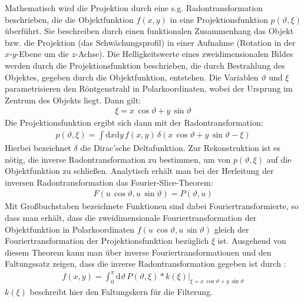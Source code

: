 \documentclass[11pt, a4paper]{article}
\numberwithin{equation}{section}
\begin{document}
Mathematisch wird die Projektion durch eine s.g. Radontransformation beschrieben, die die Objektfunktion $f(x, y)$ in eine Projektionsfunktion $p(\vartheta, \xi)$ überführt.
Sie beschreiben durch einen funktionalen Zusammenhang das Objekt bzw. die Projektion (das Schwächungsprofil) in einer Aufnahme (Rotation in der $x$-$y$-Ebene um die $z$-Achse).
Die Helligkeitswerte eines zweidimensionalen Bildes werden durch die Projektionsfunktion beschrieben, die durch Bestrahlung des Objektes, gegeben durch die Objektfunktion, entstehen.
Die Variablen $\vartheta$ und $\xi$ parametrisieren den Röntgenstrahl in Polarkoordinaten, wobei der Ursprung im Zentrum des Objekts liegt.
Dann gilt:
\begin{align}
\xi=x\,\cos\vartheta + y\,\sin\vartheta
\end{align}
Die Projektionsfunktion ergibt sich dann mit der Radontransformation:
\begin{align}
p(\vartheta, \xi)=\int\mathrm{d}x\mathrm{d}y\,f(x, y)\,\delta(x\,\cos\vartheta + y\,\sin\vartheta - \xi)
\end{align}
Hierbei bezeichnet $\delta$ die Dirac'sche Deltafunktion.
Zur Rekonstruktion ist es nötig, die inverse Radontransformation zu bestimmen, um von $p(\vartheta, \xi)$ auf die Objektfunktion zu schließen.
Analytisch erhält man bei der Herleitung der inversen Radontransformation das Fourier-Slice-Theorem:
\begin{align}
F(u\,\cos\vartheta, u\,\sin\vartheta)=P(\vartheta, u)
\end{align}
Mit Großbuchstaben bezeichnete Funktionen sind dabei Fouriertransformierte, so dass man erhält, dass die zweidimensionale Fouriertransformation der Objektfunktion in Polarkoordinaten $f(u\,\cos\vartheta, u\,\sin\vartheta)$ gleich der Fouriertransformation der Projektionsfunktion bezüglich $\xi$ ist.
Ausgehend von diesem Theorem kann man über inverse Fouriertransformationen und den Faltungssatz zeigen, dass die inverse Radontransformation gegeben ist durch \cite{kalender}:
\begin{align}
f(x,y)=\int_{0}^{\pi}\left.\mathrm{d}\vartheta\,P(\vartheta, \xi)*k(\xi)\right|_{\xi=x\,\cos\vartheta + y\,\sin\vartheta}
\end{align}
$k(\xi)$ beschreibt hier den Faltungskern für die Filterung.
\end{document}
